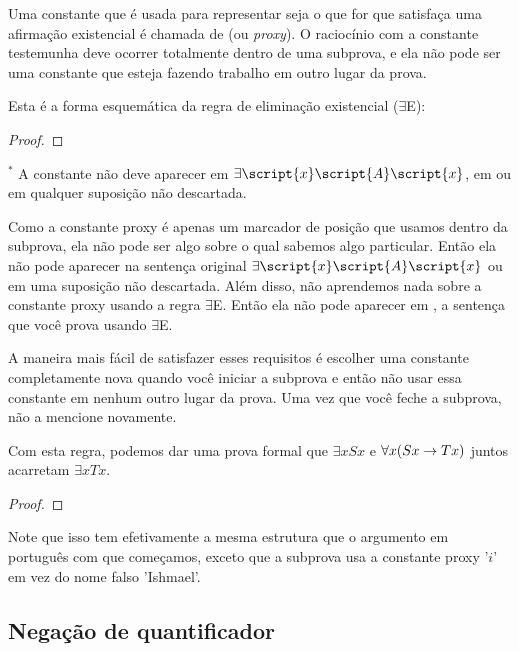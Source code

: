 Uma constante que é usada para representar seja o que for que satisfaça uma afirmação existencial é chamada de  (ou \emph{proxy}). O raciocínio com a constante testemunha deve ocorrer totalmente dentro de uma subprova, e ela não pode ser uma constante que esteja fazendo trabalho em outro lugar da prova.

Esta é a forma esquemática da regra de eliminação existencial ($\exists$E): 

\begin{proof}
	\open	
	\close
	 
\end{proof}
$^\ast$ A constante  não deve aparecer em $\exists\script{x}\script{A}\script{x}$, em  ou em qualquer suposição não descartada.

Como a constante proxy é apenas um marcador de posição que usamos dentro da subprova, ela não pode ser algo sobre o qual sabemos algo particular. Então ela não pode aparecer na sentença original $\exists\script{x}\script{A}\script{x}$ ou em uma suposição não descartada. Além disso, não aprendemos nada sobre a constante proxy usando a regra $\exists$E. Então ela não pode aparecer em , a sentença que você prova usando $\exists$E.

A maneira mais fácil de satisfazer esses requisitos é escolher uma constante completamente nova quando você iniciar a subprova e então não usar essa constante em nenhum outro lugar da prova. Uma vez que você feche a subprova, não a mencione novamente.

Com esta regra, podemos dar uma prova formal que $\exists x Sx$ e $\forall x(Sx \rightarrow Tx)$ juntos acarretam $\exists x Tx$.

\begin{proof}
	\open
		 
	\close
\end{proof}

Note que isso tem efetivamente a mesma estrutura que o argumento em português com que começamos, exceto que a subprova usa a constante proxy '$i$' em vez do nome falso 'Ishmael'.

\subsection{Negação de quantificador}

